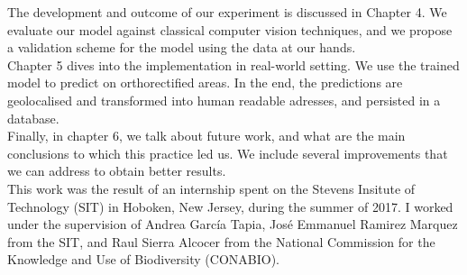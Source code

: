 The development and outcome of our experiment is discussed in Chapter 4. We evaluate our model against classical computer vision techniques, and we propose a validation scheme for the model using the data at our hands.\\

Chapter 5 dives into the implementation in real-world setting. We use the trained model to predict on orthorectified areas. In the end, the predictions are geolocalised and transformed into human readable adresses, and persisted in a database.\\

Finally, in chapter 6, we talk about future work, and what are the main conclusions to which this practice led us. We include several improvements that we can address to obtain better results.\\

This work was the result of an internship spent on the Stevens Insitute of Technology (SIT) in Hoboken, New Jersey, during the summer of 2017. I worked under the supervision of Andrea Garc\'ia Tapia, Jos\'e Emmanuel Ramirez Marquez from the SIT, and Raul Sierra Alcocer from the National Commission for the Knowledge and Use of Biodiversity (CONABIO).\\